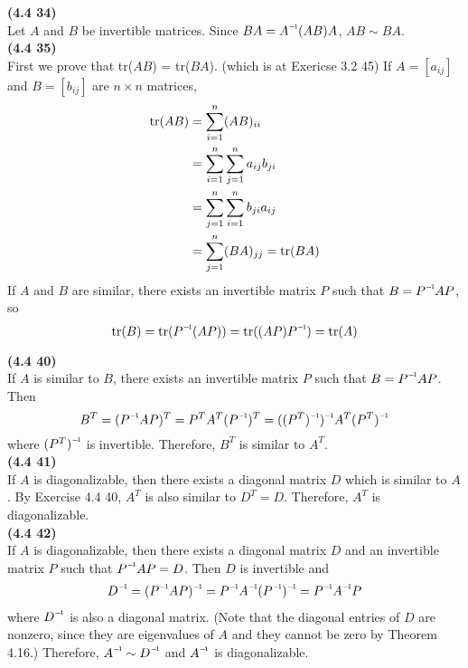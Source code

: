 \textbf{(4.4 34)} \\
Let $A$ and $B$ be invertible matrices. Since $BA = \inv{A}(AB)A$, $AB \sim BA$. \\

\textbf{(4.4 35)} \\
First we prove that tr($AB$) = tr($BA$). (which is at Exericse 3.2 45) If $A=[a_{ij}]$ and $B=[b_{ij}]$ are $n \times n$ matrices,  \begin{align*}
	\textnormal{tr}(AB) &= \sum_{i=1}^{n}(AB)_{ii} \\
	&= \sum_{i=1}^{n}\sum_{j=1}^{n}a_{ij}b_{ji} \\
	&= \sum_{j=1}^{n}\sum_{i=1}^{n}b_{ji}a_{ij} \\
	&= \sum_{j=1}^{n}(BA)_{jj} = \textnormal{tr}(BA)
\end{align*}
If $A$ and $B$ are similar, there exists an invertible matrix $P$ such that $B = \inv{P}AP$, so \begin{equation*}
	\textnormal{tr}(B) = \textnormal{tr}(\inv{P}(AP)) = \textnormal{tr}((AP)\inv{P}) = \textnormal{tr}(A)
\end{equation*}

\textbf{(4.4 40)} \\
If $A$ is similar to $B$, there exists an invertible matrix $P$ such that $B = \inv{P}AP$. Then \begin{equation*}
	B^T = (\inv{P}AP)^T = P^TA^T(\inv{P})^T = \inv{(\inv{(P^T)})}A^T\inv{(P^T)}
\end{equation*} where $\inv{(P^T)}$ is invertible. Therefore, $B^T$ is similar to $A^T$. \\

\textbf{(4.4 41)} \\
If $A$ is diagonalizable, then there exists a diagonal matrix $D$ which is similar to $A$. By Exercise 4.4 40, $A^T$ is also similar to $D^T = D$. Therefore, $A^T$ is diagonalizable. \\

\textbf{(4.4 42)} \\
If $A$ is diagonalizable, then there exists a diagonal matrix $D$ and an invertible matrix $P$ such that $\inv{P}AP = D$. Then $D$ is invertible and \begin{align*}
	\inv{D} = \inv{(\inv{P}AP)} = \inv{P}\inv{A}\inv{(\inv{P})} = \inv{P}\inv{A}P
\end{align*} where $\inv{D}$ is also a diagonal matrix. (Note that the diagonal entries of $D$ are nonzero, since they are eigenvalues of $A$ and they cannot be zero by Theorem 4.16.) Therefore, $\inv{A} \sim \inv{D}$ and $\inv{A}$ is diagonalizable. \\

